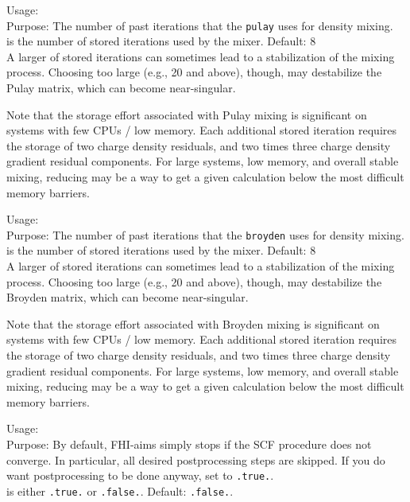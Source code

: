 {
  \noindent 
  Usage:   \\[1.0ex]
  Purpose: The number of past iterations that the \texttt{pulay}
     uses for density mixing. \\[1.0ex]
   is the number of stored iterations used by the
    mixer. Default: 8 \\
}
A larger  of stored iterations can sometimes lead to a
stabilization of the mixing process. Choosing  too
large (e.g., 20 and above), though, may destabilize the Pulay matrix,
which can become near-singular. 

Note that the storage effort associated with Pulay mixing is
significant on systems with few CPUs / low memory. Each additional
stored iteration requires the storage of two charge density
residuals, and two times three charge density gradient residual
components. For large systems, low memory, and overall stable mixing,
reducing  may be a way to get a given
calculation below the most difficult memory barriers.

{
  \noindent 
  Usage:   \\[1.0ex]
  Purpose: The number of past iterations that the \texttt{broyden}
     uses for density mixing. \\[1.0ex]
   is the number of stored iterations used by the
    mixer. Default: 8 \\
}
A larger  of stored iterations can sometimes lead to a
stabilization of the mixing process. Choosing  too
large (e.g., 20 and above), though, may destabilize the Broyden matrix,
which can become near-singular. 

Note that the storage effort associated with Broyden mixing is
significant on systems with few CPUs / low memory. Each additional
stored iteration requires the storage of two charge density
residuals, and two times three charge density gradient residual
components. For large systems, low memory, and overall stable mixing,
reducing  may be a way to get a given
calculation below the most difficult memory barriers.

{
  \noindent
  Usage:   \\[1.0ex]
  Purpose: By default, FHI-aims simply stops if the SCF procedure does not
  converge.  In particular, all desired postprocessing steps are skipped.  If
  you do want postprocessing to be done anyway, set  to
  \texttt{.true.}. \\[1.0ex]
   is either \texttt{.true.} or \texttt{.false.}. Default:
  \texttt{.false.}. 
  \\
}

